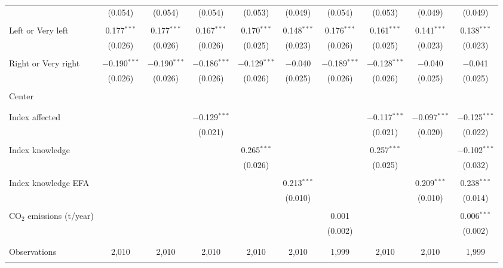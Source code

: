 \begin{tabular}{@{\extracolsep{5pt}}lccccccccc}
  & (0.054) & (0.054) & (0.054) & (0.053) & (0.049) & (0.054) & (0.053) & (0.049) & (0.049) \\ 
  & & & & & & & & & \\ 
 Left or Very left & 0.177$^{***}$ & 0.177$^{***}$ & 0.167$^{***}$ & 0.170$^{***}$ & 0.148$^{***}$ & 0.176$^{***}$ & 0.161$^{***}$ & 0.141$^{***}$ & 0.138$^{***}$ \\ 
  & (0.026) & (0.026) & (0.026) & (0.025) & (0.023) & (0.026) & (0.025) & (0.023) & (0.023) \\ 
  & & & & & & & & & \\ 
 Right or Very right & $-$0.190$^{***}$ & $-$0.190$^{***}$ & $-$0.186$^{***}$ & $-$0.129$^{***}$ & $-$0.040 & $-$0.189$^{***}$ & $-$0.128$^{***}$ & $-$0.040 & $-$0.041 \\ 
  & (0.026) & (0.026) & (0.026) & (0.026) & (0.025) & (0.026) & (0.026) & (0.025) & (0.025) \\ 
  & & & & & & & & & \\ 
 Center &  &  &  &  &  &  &  &  &  \\ 
  &  &  &  &  &  &  &  &  &  \\ 
  & & & & & & & & & \\ 
 Index affected &  &  & $-$0.129$^{***}$ &  &  &  & $-$0.117$^{***}$ & $-$0.097$^{***}$ & $-$0.125$^{***}$ \\ 
  &  &  & (0.021) &  &  &  & (0.021) & (0.020) & (0.022) \\ 
  & & & & & & & & & \\ 
 Index knowledge &  &  &  & 0.265$^{***}$ &  &  & 0.257$^{***}$ &  & $-$0.102$^{***}$ \\ 
  &  &  &  & (0.026) &  &  & (0.025) &  & (0.032) \\ 
  & & & & & & & & & \\ 
 Index knowledge EFA &  &  &  &  & 0.213$^{***}$ &  &  & 0.209$^{***}$ & 0.238$^{***}$ \\ 
  &  &  &  &  & (0.010) &  &  & (0.010) & (0.014) \\ 
  & & & & & & & & & \\ 
 CO$_{2}$ emissions (t/year) &  &  &  &  &  & 0.001 &  &  & 0.006$^{***}$ \\ 
  &  &  &  &  &  & (0.002) &  &  & (0.002) \\ 
  & & & & & & & & & \\ 
\hline \\[-1.8ex] 

Observations & 2,010 & 2,010 & 2,010 & 2,010 & 2,010 & 1,999 & 2,010 & 2,010 & 1,999 \\ 
\hline 
\hline \\[-1.8ex] 
\end{tabular} 